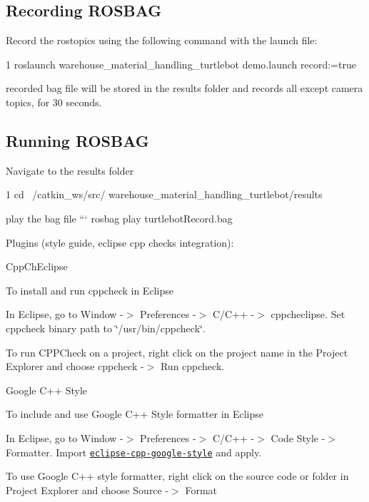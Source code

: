 \subsection*{Recording R\+O\+S\+B\+AG}

Record the rostopics using the following command with the launch file\+: 
\begin{DoxyCode}
1 roslaunch  warehouse\_material\_handling\_turtlebot demo.launch record:=true
\end{DoxyCode}
 recorded bag file will be stored in the results folder and records all except camera topics, for 30 seconds.

\subsection*{Running R\+O\+S\+B\+AG}

Navigate to the results folder 
\begin{DoxyCode}
1 cd ~/catkin\_ws/src/ warehouse\_material\_handling\_turtlebot/results
\end{DoxyCode}
 play the bag file ``` rosbag play turtlebot\+Record.\+bag

Plugins (style guide, eclipse cpp checks integration)\+:
\begin{DoxyItemize}
\item Cpp\+Ch\+Eclipse

To install and run cppcheck in Eclipse
\begin{DoxyEnumerate}
\item In Eclipse, go to Window -\/$>$ Preferences -\/$>$ C/\+C++ -\/$>$ cppcheclipse. Set cppcheck binary path to \char`\"{}/usr/bin/cppcheck\char`\"{}.
\item To run C\+P\+P\+Check on a project, right click on the project name in the Project Explorer and choose cppcheck -\/$>$ Run cppcheck.
\end{DoxyEnumerate}
\item Google C++ Style

To include and use Google C++ Style formatter in Eclipse
\begin{DoxyEnumerate}
\item In Eclipse, go to Window -\/$>$ Preferences -\/$>$ C/\+C++ -\/$>$ Code Style -\/$>$ Formatter. Import \href{https://raw.githubusercontent.com/google/styleguide/gh-pages/eclipse-cpp-google-style.xml}{\tt eclipse-\/cpp-\/google-\/style} and apply.
\item To use Google C++ style formatter, right click on the source code or folder in Project Explorer and choose Source -\/$>$ Format 
\end{DoxyEnumerate}
\end{DoxyItemize}